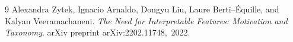 \documentclass[12pt]{article}
\begin{document}
\begin{thebibliography}{9}
Alexandra Zytek, Ignacio Arnaldo, Dongyu Liu, Laure Berti–Équille, and Kalyan Veeramachaneni. 
\emph{The Need for Interpretable Features: Motivation and Taxonomy}. 
arXiv preprint arXiv:2202.11748, 2022.
\end{thebibliography}
\end{document}
